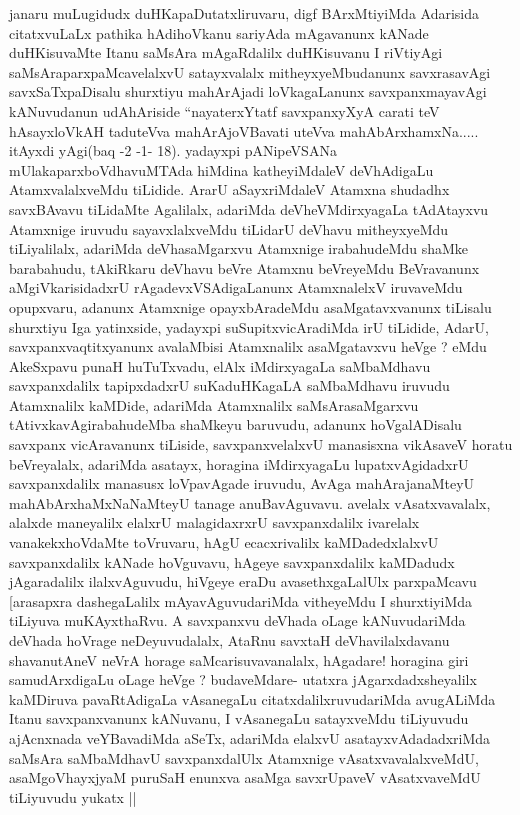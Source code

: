 \begin{artha}
janaru muLugidudx duHKapaDutatxliruvaru, digf BArxMtiyiMda Adarisida
citatxvuLaLx pathika hAdihoVkanu sariyAda mAgavanunx kANade
duHKisuvaMte Itanu saMsAra mAgaRdalilx duHKisuvanu I riVtiyAgi
saMsAraparxpaMcavelalxvU satayxvalalx mitheyxyeMbudanunx savxrasavAgi
savxSaTxpaDisalu shurxtiyu mahArAjadi loVkagaLanunx savxpanxmayavAgi
kANuvudanun udAhAriside ``nayaterxYtatf savxpanxyXyA carati teV
hAsayxloVkAH taduteVva mahArAjoVBavati uteVva
mahAbArxhamxNa..... itAyxdi yAgi(baq -2 -1- 18). yadayxpi pANipeVSANa
mUlakaparxboVdhavuMTAda hiMdina katheyiMdaleV deVhAdigaLu
AtamxvalalxveMdu tiLidide. ArarU aSayxriMdaleV Atamxna shudadhx
savxBAvavu tiLidaMte Agalilalx, adariMda deVheVMdirxyagaLa tAdAtayxvu
Atamxnige iruvudu sayavxlalxveMdu tiLidarU deVhavu mitheyxyeMdu
tiLiyalilalx, adariMda deVhasaMgarxvu Atamxnige irabahudeMdu shaMke
barabahudu, tAkiRkaru deVhavu beVre Atamxnu beVreyeMdu BeVravanunx
aMgiVkarisidadxrU rAgadevxVSAdigaLanunx AtamxnalelxV iruvaveMdu
opupxvaru, adanunx Atamxnige opayxbAradeMdu asaMgatavxvanunx tiLisalu
shurxtiyu Iga yatinxside, yadayxpi suSupitxvicAradiMda irU tiLidide,
AdarU, savxpanxvaqtitxyanunx avalaMbisi Atamxnalilx asaMgatavxvu heVge
? eMdu AkeSxpavu punaH huTuTxvadu, elAlx iMdirxyagaLa saMbaMdhavu
savxpanxdalilx tapipxdadxrU suKaduHKagaLA saMbaMdhavu iruvudu
Atamxnalilx kaMDide, adariMda Atamxnalilx saMsArasaMgarxvu
tAtivxkavAgirabahudeMba shaMkeyu baruvudu, adanunx hoVgalADisalu
savxpanx vicAravanunx tiLiside, savxpanxvelalxvU manasisxna vikAsaveV
horatu beVreyalalx, adariMda asatayx, horagina iMdirxyagaLu
lupatxvAgidadxrU savxpanxdalilx manasusx loVpavAgade iruvudu, AvAga
mahArajanaMteyU mahAbArxhaMxNaNaMteyU tanage anuBavAguvavu. avelalx
vAsatxvavalalx, alalxde maneyalilx elalxrU malagidaxrxrU
savxpanxdalilx ivarelalx vanakekxhoVdaMte toVruvaru, hAgU
ecacxrivalilx kaMDadedxlalxvU savxpanxdalilx kANade hoVguvavu, hAgeye
savxpanxdalilx kaMDadudx jAgaradalilx ilalxvAguvudu, hiVgeye eraDu
avasethxgaLalUlx parxpaMcavu [arasapxra dashegaLalilx
mAyavAguvudariMda vitheyeMdu I shurxtiyiMda tiLiyuva muKAyxthaRvu.
A savxpanxvu deVhada oLage kANuvudariMda deVhada hoVrage
neDeyuvudalalx, AtaRnu savxtaH deVhavilalxdavanu shavanutAneV neVrA
horage saMcarisuvavanalalx, hAgadare! horagina giri samudArxdigaLu
oLage heVge ? budaveMdare- utatxra jAgarxdadxsheyalilx kaMDiruva
pavaRtAdigaLa vAsanegaLu citatxdalilxruvudariMda avugALiMda Itanu
savxpanxvanunx kANuvanu, I vAsanegaLu satayxveMdu tiLiyuvudu
ajAcnxnada veYBavadiMda aSeTx, adariMda elalxvU asatayxvAdadadxriMda
saMsAra saMbaMdhavU savxpanxdalUlx Atamxnige vAsatxvavalalxveMdU,
asaMgoVhayxjyaM puruSaH enunxva asaMga savxrUpaveV vAsatxvaveMdU
tiLiyuvudu yukatx ||  
\end{artha}

